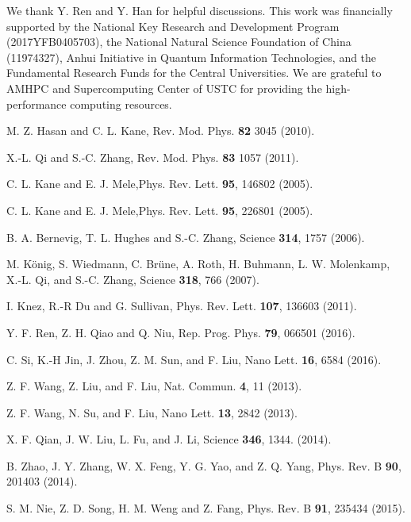 \documentclass[aps,prl,twocolumn,showpacs,superscriptaddress]{revtex4-1}
\begin{document}
\begin{acknowledgments}
We thank Y. Ren and Y. Han for helpful discussions. This work was financially supported by the National Key Research and Development Program (2017YFB0405703), the National Natural Science Foundation of China (11974327), Anhui Initiative in Quantum Information Technologies, and the Fundamental Research Funds for the Central Universities. We are grateful to AMHPC and Supercomputing Center of USTC for providing the high-performance computing resources.
\end{acknowledgments}

\begin{thebibliography}{99}
M. Z. Hasan and C. L. Kane, Rev. Mod. Phys. \textbf{82} 3045 (2010).

X.-L. Qi and S.-C. Zhang, {Rev. Mod. Phys. \textbf{83} 1057 (2011)}.

C. L. Kane and E. J. Mele,{Phys. Rev. Lett. \textbf{95}, 146802 (2005)}.

C. L. Kane and E. J. Mele,{Phys. Rev. Lett. \textbf{95}, 226801 (2005)}.

B. A. Bernevig, T. L. Hughes and S.-C. Zhang, {Science \textbf{314}, 1757 (2006)}.

M. König, S. Wiedmann, C. Brüne, A. Roth, H. Buhmann, L. W. Molenkamp, X.-L. Qi, and S.-C. Zhang, {Science \textbf{318}, 766 (2007)}.

I. Knez, R.-R Du and G. Sullivan, {Phys. Rev. Lett. \textbf{107}, 136603 (2011)}.

Y. F. Ren, Z. H. Qiao and Q. Niu, {Rep. Prog. Phys. \textbf{79}, 066501 (2016)}.

C. Si, K.-H Jin, J. Zhou, Z. M. Sun, and F. Liu, {Nano Lett. \textbf{16}, 6584 (2016)}.

Z. F. Wang, Z. Liu, and F. Liu, {Nat. Commun. \textbf{4}, 11 (2013)}.

Z. F. Wang, N. Su, and F. Liu, {Nano Lett. \textbf{13}, 2842 (2013)}.

X. F. Qian, J. W. Liu, L. Fu, and J. Li, {Science \textbf{346}, 1344. (2014)}.

B. Zhao, J. Y. Zhang, W. X. Feng, Y. G. Yao, and Z. Q. Yang, {Phys. Rev. B \textbf{90}, 201403 (2014)}.

S. M. Nie, Z. D. Song, H. M. Weng and Z. Fang, {Phys. Rev. B \textbf{91}, 235434 (2015)}.


\end{thebibliography}
\end{document}
